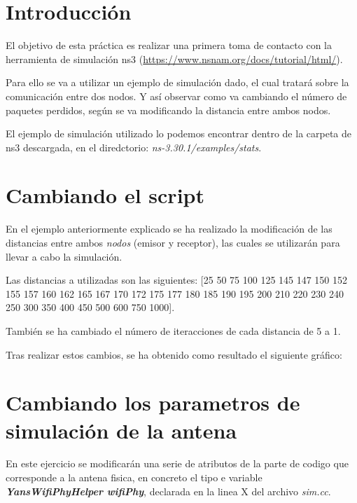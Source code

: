 \documentclass[11pt]{article}
\begin{document}

\tableofcontents
\pagebreak



\section{Introducción}
El objetivo de esta práctica es realizar una primera toma de contacto con la herramienta de simulación ns3 (\url{https://www.nsnam.org/docs/tutorial/html/}).

Para ello se va a utilizar un ejemplo de simulación dado, el cual tratará sobre la comunicación entre dos nodos. Y así observar como va cambiando el número de paquetes perdidos, según se va modificando la distancia entre ambos nodos.

El ejemplo de simulación utilizado lo podemos encontrar dentro de la carpeta de ns3 descargada, en el diredctorio: \textit{ns-3.30.1/examples/stats}.
\\



\clearpage

\section{Cambiando el script}
En el ejemplo anteriormente explicado se ha realizado la modificación de las distancias entre ambos \textit{nodos} (emisor y receptor), las cuales se utilizarán para llevar a cabo la simulación.

Las distancias a utilizadas son las siguientes:
[25 50 75 100 125 145 147
150 152 155 157 160 162 165 167 170 172 175 177 180 185 190 195 200 210 220 230 240 250
300 350 400 450 500 600 750 1000].

También se ha cambiado el número de iteracciones de cada distancia de 5 a 1.

Tras realizar estos cambios, se ha obtenido como resultado el siguiente gráfico:
\\


\clearpage

\section{Cambiando los parametros de simulación de la antena}
En este ejercicio se modificarán una serie de atributos de la parte de codigo que corresponde a la antena fisica, en concreto el tipo e variable \textit{\textbf{YansWifiPhyHelper wifiPhy}}, declarada en la linea X del archivo \textit{sim.cc}. 
\end{document}
